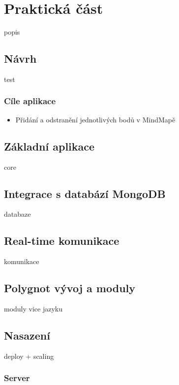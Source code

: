 
\chapter{Praktická část}

popis

\section{Návrh}

test

\subsection{Cíle aplikace}

\begin{itemize}
\item Přidání a odstranění jednotlivých bodů v MindMapě
\end{itemize}

\section{Základní aplikace}

core

\section{Integrace s databází MongoDB}

databaze

\section{Real-time komunikace}\label{sec:realTimeCommunication}

komunikace

\section{Polygnot vývoj a moduly}

moduly vice jazyku

\section{Nasazení}

deploy + scaling

\subsection{Server}


